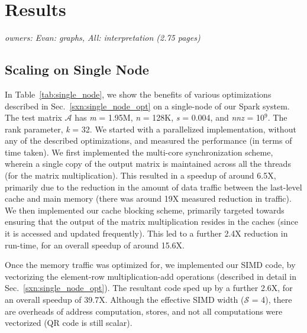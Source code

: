 \section{Results}
\label{sec:results}


\textit{owners: Evan: graphs, All: interpretation (2.75 pages)}

\subsection{Scaling on Single Node}
  \label{sxn:results1}


   
  \vspace*{0.1in}

      In Table~\ref{tab:single_node}, we show the benefits of various
      optimizations described in
      Sec.~\ref{sxn:single_node_opt} on a single-node of our Spark system. 
      The test matrix $\mathcal{A}$ has {\it{m}} = 1.95M, {\it{n}} = 128K,
      {\it{s}} = 0.004, and {\it{nnz}} = 10$^9$. The rank parameter,
      {\it{k}} = 32. We started with a parallelized implementation,
      without any of the described optimizations, and measured the
      performance (in terms of time taken). We first implemented the
      multi-core synchronization scheme, wherein a single copy of the
      output matrix is maintained across all the threads (for the matrix multiplication).
      This resulted in a speedup of around 6.5X, primarily due to
      the reduction in the amount of data traffic between the
      last-level cache and main memory (there was around 19X measured reduction
      in traffic). We then implemented our cache blocking scheme,
      primarily targeted towards ensuring that the output of the
      matrix multiplication resides in the caches (since it is
      accessed and updated frequently). This led to a further 2.4X
     reduction in run-time, for an overall speedup of around 15.6X.

     Once the memory traffic was optimized for, we implemented our
     SIMD code, by vectorizing the element-row multiplication-add
     operations (described in detail in Sec.~\ref{sxn:single_node_opt}). 
     The resultant code sped up by a further 2.6X, for an overall
     speedup of 39.7X. Although the effective SIMD width
 ($\mathcal{S}$ = 4), there are overheads of address computation,
 stores, and not all computations were vectorized (QR code is still
 scalar).


